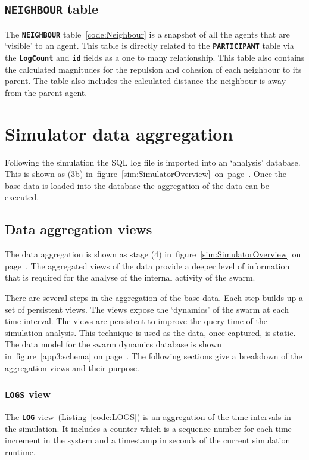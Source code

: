 \subsection{\texttt{\textbf{NEIGHBOUR}} table} 
The \texttt{\textbf{NEIGHBOUR}} table~\ref{code:Neighbour} is a snapshot of all the agents that are `visible' to an agent. This table is directly related to the \texttt{\textbf{PARTICIPANT}} table via the \texttt{\textbf{LogCount}} and \texttt{\textbf{id}} fields as a one to many relationship. This table also contains the calculated magnitudes for the repulsion and cohesion of each neighbour to its parent. The table also includes the calculated distance the neighbour is away from the parent agent. 

\section{Simulator data aggregation}
Following the simulation the SQL log file is imported into an `analysis' database. This is shown as (3b) in~figure~\ref{sim:SimulatorOverview}~on~page~\pageref{sim:SimulatorOverview}. Once the base data is loaded into the database the aggregation of the data can be executed.

\subsection{Data aggregation views}
The data aggregation is shown as stage (4) in~figure~\ref{sim:SimulatorOverview} on page~\pageref{sim:SimulatorOverview}. The aggregated views of the data provide a deeper level of information that is required for the analyse of the internal activity of the swarm.

There are several steps in the aggregation of the base data. Each step builds up a set of persistent views. The views expose the `dynamics' of the swarm at each time interval. The views are persistent to improve the query time of the simulation analysis. This technique is used as the data, once captured, is static. The data model for the swarm dynamics database is shown in~figure~\ref{app3:schema} on page~\pageref{app3:schema}. The following sections give a breakdown of the aggregation views and their purpose.

\subsubsection{\texttt{\textbf{LOGS}} view}
The \texttt{\textbf{LOG}} view~(Listing~\ref{code:LOGS}) is an aggregation of the time intervals in the simulation. It includes a counter which is a sequence number for each time increment in the system and a timestamp in seconds of the current simulation runtime.

